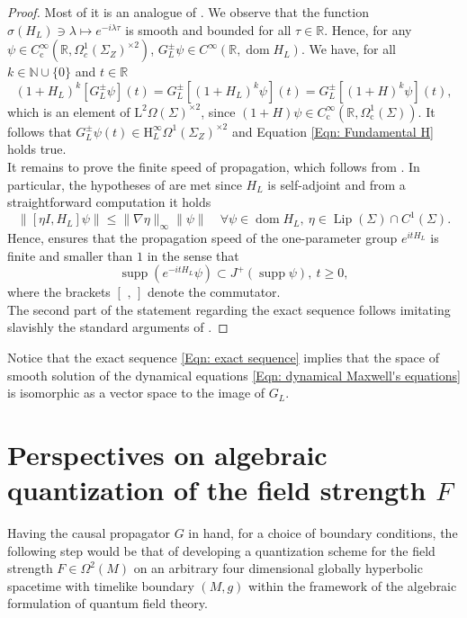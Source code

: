 \begin{proof}
	Most of it is an analogue of \parencite[Thm. 30- Prop. 36]{Dappiaggi-Drago-Ferreira-19}. We observe that the function $\sigma(H_L)\ni \lambda\mapsto e^{-i\lambda\tau}$ is smooth and bounded for all $\tau\in\mathbb{R}$. Hence, for any $\psi\in C_\mathrm{c}^\infty(\mathbb{R},\Omega_c^1(\Sigma_Z)^{\times 2})$, $G^\pm_L \psi\in C^\infty(\mathbb{R},\operatorname{dom}H_L)$. We have, for all $k\in\mathbb{N}\cup\{0\}$ and $t\in\mathbb{R}$
	\[	(1+H_L)^k	[G^\pm_L \psi](t)=G^\pm_L [(1+H_L)^k\psi](t)= G^\pm_L [(1+H)^k\psi](t),	\]
	which is an element of $\mathrm{L}^2\Omega(\Sigma)^{\times 2}$, since $(1+H)\psi\in C^\infty_\mathrm{c}(\mathbb{R},\Omega^1_\mathrm{c}(\Sigma))$. It follows that $G^\pm_L \psi(t)\in \mathrm{H}^\infty_L\Omega^1(\Sigma_Z)^{\times 2}$ and Equation \eqref{Eqn: Fundamental H} holds true.\\
	It remains to prove the finite speed of propagation, which follows from \parencite{Higson-Roe-00,Mcintosh-Morris-13}. In particular, the hypotheses of \parencite[Thm. 1.1]{Mcintosh-Morris-13} are met since $H_L$ is self-adjoint and from a straightforward computation it holds $$\|[\eta I,H_L]\psi\|\leq\|\nabla \eta\|_\infty\|\psi\| \quad \forall\psi\in\operatorname{dom}H_L,\ \eta\in \operatorname{Lip}(\Sigma)\cap C^1(\Sigma).$$ Hence, \parencite[Thm. 1.1]{Mcintosh-Morris-13} ensures that the propagation speed of the one-parameter group $e^{itH_L}$ is finite and smaller than $1$ in the sense that
	\[	\operatorname{supp}(e^{-itH_L}\psi)\subset J^+(\operatorname{supp}\psi),\ t\geq 0,	\]
	where the brackets $[\,\,,\,]$ denote the commutator.\\
	The second part of the statement regarding the exact sequence follows imitating slavishly the standard arguments of \parencite[Th. 3.4.7]{Baer-Ginoux-Pfaffle-07} \parencite[Prop. 36]{Dappiaggi-Drago-Ferreira-19}.
\end{proof}
	Notice that the exact sequence \eqref{Eqn: exact sequence} implies that the space of smooth solution of the dynamical equations \eqref{Eqn: dynamical Maxwell's equations} is isomorphic as a vector space to the image of $G_L$.
	
	
	
\section{Perspectives on algebraic quantization of the field strength $F$}\label{Sec: perspectives on F}

Having the causal propagator $G$ in hand, for a choice of boundary conditions, the following step would be that of developing a quantization scheme for the field strength $F\in\Omega^2(M)$ on an arbitrary four dimensional globally hyperbolic spacetime with timelike boundary $(M,g)$ within the framework of the algebraic formulation of quantum field theory.\\


